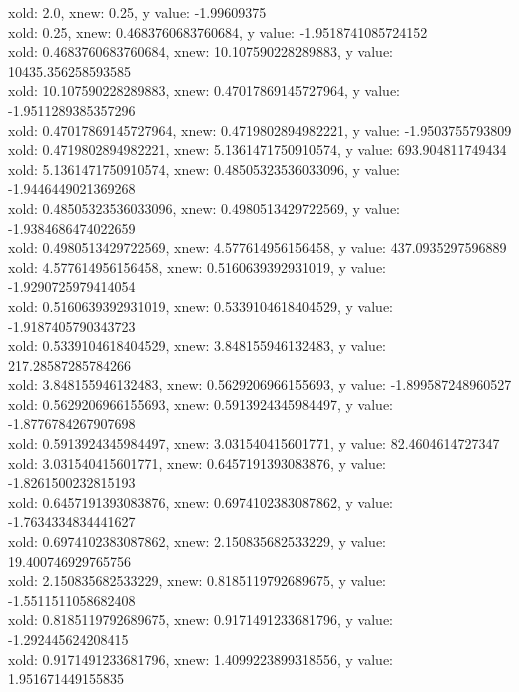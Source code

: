 \documentclass[12pt]{article}
\begin{document}
\begin{enumerate}
\begin{footnotesize}
\begin{spacing}{-.8}
xold: 2.0, xnew: 0.25, y value: -1.99609375\\
xold: 0.25, xnew: 0.4683760683760684, y value: -1.9518741085724152\\
xold: 0.4683760683760684, xnew: 10.107590228289883, y value: 10435.356258593585\\
xold: 10.107590228289883, xnew: 0.47017869145727964, y value: -1.9511289385357296\\
xold: 0.47017869145727964, xnew: 0.4719802894982221, y value: -1.9503755793809\\
xold: 0.4719802894982221, xnew: 5.1361471750910574, y value: 693.904811749434\\
xold: 5.1361471750910574, xnew: 0.48505323536033096, y value: -1.9446449021369268\\
xold: 0.48505323536033096, xnew: 0.4980513429722569, y value: -1.9384686474022659\\
xold: 0.4980513429722569, xnew: 4.577614956156458, y value: 437.0935297596889\\
xold: 4.577614956156458, xnew: 0.5160639392931019, y value: -1.9290725979414054\\
xold: 0.5160639392931019, xnew: 0.5339104618404529, y value: -1.9187405790343723\\
xold: 0.5339104618404529, xnew: 3.848155946132483, y value: 217.28587285784266\\
xold: 3.848155946132483, xnew: 0.5629206966155693, y value: -1.899587248960527\\
xold: 0.5629206966155693, xnew: 0.5913924345984497, y value: -1.8776784267907698\\
xold: 0.5913924345984497, xnew: 3.031540415601771, y value: 82.4604614727347\\
xold: 3.031540415601771, xnew: 0.6457191393083876, y value: -1.8261500232815193\\
xold: 0.6457191393083876, xnew: 0.6974102383087862, y value: -1.7634334834441627\\
xold: 0.6974102383087862, xnew: 2.150835682533229, y value: 19.400746929765756\\
xold: 2.150835682533229, xnew: 0.8185119792689675, y value: -1.5511511058682408\\
xold: 0.8185119792689675, xnew: 0.9171491233681796, y value: -1.292445624208415\\
xold: 0.9171491233681796, xnew: 1.4099223899318556, y value: 1.951671449155835\\

\end{spacing}
\end{footnotesize}
\end{enumerate}
\end{document}
